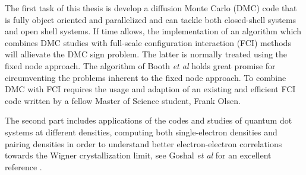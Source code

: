 \documentclass[twocolumn]{revtex4}
\begin{document}
The first task of this thesis is develop a diffusion Monte Carlo (DMC) code that is fully object oriented and
parallelized and can tackle both closed-shell systems and open shell systems. If time allows, the implementation  of an algorithm which combines DMC studies with full-scale configuration interaction (FCI) methods will allievate the DMC sign problem. The latter is normally treated using the fixed node approach. The algorithm
of Booth {\em et al} \cite{booth2009} holds great promise for circumventing the problems inherent to the fixed node approach. To combine DMC with FCI requires the usage and adaption of an existing and efficient 
FCI code written by a fellow Master of Science student, Frank Olsen. 

The second part includes applications of the codes and studies of quantum dot systems at different 
densities, computing both single-electron densities and pairing densities in order to understand 
better electron-electron correlations towards the Wigner crystallization limit, see Goshal {\em et al}
for an excellent reference \cite{ghosal2007}. 
\end{document}
